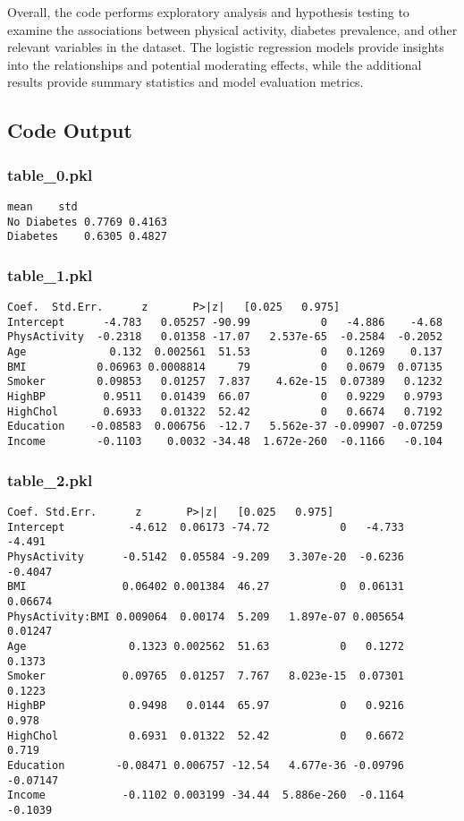 \documentclass[11pt]{article}
\begin{document}
Overall, the code performs exploratory analysis and hypothesis testing to examine the associations between physical activity, diabetes prevalence, and other relevant variables in the dataset. The logistic regression models provide insights into the relationships and potential moderating effects, while the additional results provide summary statistics and model evaluation metrics.

\subsection{Code Output}

\subsubsection*{table\_0.pkl}

\begin{Verbatim}[tabsize=4]
              mean    std
No Diabetes 0.7769 0.4163
Diabetes    0.6305 0.4827
\end{Verbatim}

\subsubsection*{table\_1.pkl}

\begin{Verbatim}[tabsize=4]
                Coef.  Std.Err.      z       P>|z|   [0.025   0.975]
Intercept      -4.783   0.05257 -90.99           0   -4.886    -4.68
PhysActivity  -0.2318   0.01358 -17.07   2.537e-65  -0.2584  -0.2052
Age             0.132  0.002561  51.53           0   0.1269    0.137
BMI           0.06963 0.0008814     79           0   0.0679  0.07135
Smoker        0.09853   0.01257  7.837    4.62e-15  0.07389   0.1232
HighBP         0.9511   0.01439  66.07           0   0.9229   0.9793
HighChol       0.6933   0.01322  52.42           0   0.6674   0.7192
Education    -0.08583  0.006756  -12.7   5.562e-37 -0.09907 -0.07259
Income        -0.1103    0.0032 -34.48  1.672e-260  -0.1166   -0.104
\end{Verbatim}

\subsubsection*{table\_2.pkl}

\begin{Verbatim}[tabsize=4]
                    Coef. Std.Err.      z       P>|z|   [0.025   0.975]
Intercept          -4.612  0.06173 -74.72           0   -4.733   -4.491
PhysActivity      -0.5142  0.05584 -9.209   3.307e-20  -0.6236  -0.4047
BMI               0.06402 0.001384  46.27           0  0.06131  0.06674
PhysActivity:BMI 0.009064  0.00174  5.209   1.897e-07 0.005654  0.01247
Age                0.1323 0.002562  51.63           0   0.1272   0.1373
Smoker            0.09765  0.01257  7.767   8.023e-15  0.07301   0.1223
HighBP             0.9498   0.0144  65.97           0   0.9216    0.978
HighChol           0.6931  0.01322  52.42           0   0.6672    0.719
Education        -0.08471 0.006757 -12.54   4.677e-36 -0.09796 -0.07147
Income            -0.1102 0.003199 -34.44  5.886e-260  -0.1164  -0.1039
\end{Verbatim}
\end{document}
